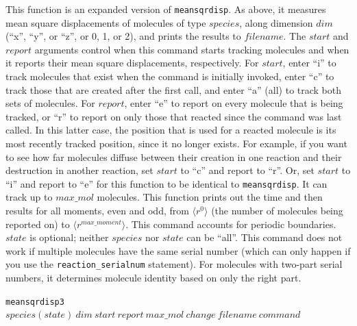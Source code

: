 \documentclass {book}
\newcommand {\ttt} {\texttt}
\begin{document}
\begin{description}
This function is an expanded version of \ttt{meansqrdisp}. As above, it measures mean square displacements of molecules of type $species$, along dimension $dim$ (``x'', ``y'', or ``z'', or 0, 1, or 2), and prints the results to $filename$. The $start$ and $report$ arguments control when this command starts tracking molecules and when it reports their mean square displacements, respectively. For $start$, enter ``i'' to track molecules that exist when the command is initially invoked, enter ``c'' to track those that are created after the first call, and enter ``a'' (all) to track both sets of molecules. For $report$, enter ``e'' to report on every molecule that is being tracked, or ``r'' to report on only those that reacted since the command was last called. In this latter case, the position that is used for a reacted molecule is its most recently tracked position, since it no longer exists. For example, if you want to see how far molecules diffuse between their creation in one reaction and their destruction in another reaction, set $start$ to ``c'' and report to ``r''. Or, set $start$ to ``i'' and report to ``e'' for this function to be identical to \ttt{meansqrdisp}. It can track up to $max\_mol$ molecules. This function prints out the time and then results for all moments, even and odd, from $\langle r^0 \rangle$ (the number of molecules being reported on) to $\langle r^{max\_moment} \rangle$. This command accounts for periodic boundaries. $state$ is optional; neither $species$ nor $state$ can be ``all''. This command does not work if multiple molecules have the same serial number (which can only happen if you use the \ttt{reaction\_serialnum} statement). For molecules with two-part serial numbers, it determines molecule identity based on only the right part.

\item{\ttt{meansqrdisp3} $species(state)\ dim\ start\ report\ max\_mol\ change\ filename\ command$}


\end{description}
\end{document}
